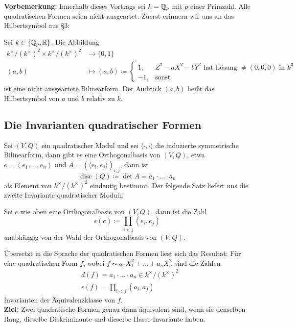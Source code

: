 \textbf{Vorbemerkung:} Innerhalb dieses Vortrags sei $k=\mathbb{Q}_p$ mit $p$ einer Primzahl. Alle quadratischen Formen 
seien nicht ausgeartet. Zuerst erinnern wir uns an das Hilbertsymbol aus §3:
\begin{remind}[Hilbertsymbol]
    Sei $k\in\{\mathbb{Q}_p,\mathbb{R}\}$. Die Abbildung 
    \begin{align*}
        k^\times/(k^\times)^2\times k^\times/(k^\times)^2&\to \{0,1\} \\  (a,b) &\mapsto (a,b) \coloneqq 
        \begin{cases}
            1, & Z^2-aX^2-bY^2 \text{ hat Lösung } \neq (0,0,0)\text{ in } k^3  \\ 
            -1, & \text{sonst}
        \end{cases}
    \end{align*}
    ist eine nicht ausgeartete Bilinearform. Der Audruck $(a,b)$ heißt das \textrm{Hilbertsymbol} von $a$ und $b$ relativ zu $k$.
\end{remind}
\subsection*{Die Invarianten quadratischer Formen}
Sei $(V,Q)$ ein quadratischer Modul und sei $\langle \cdot,\cdot\rangle$ die induzierte symmetrische Bilinearform, dann gibt es eine Orthogonalbasis von
$(V,Q)$, etwa $e=(e_1,\ldots,e_n)$ und $A=(\langle e_i,e_j\rangle)_{i,j}$, dann ist
\[
\operatorname{disc}(Q) \coloneqq \det A = a_1\cdot\ldots\cdot a_n     
\]
als Element von $k^\times/(k^\times)^2$ eindeutig bestimmt. Der folgende Satz liefert uns die zweite Invariante quadratischer Moduln
\begin{satz} Sei $e$ wie oben eine Orthogonalbasis von $(V,Q)$, dann ist die Zahl
    \[
    \epsilon(e) \coloneqq \prod_{i<j}(e_i,e_j)    
    \]
    unabhängig von der Wahl der Orthogonalbasis von $(V,Q)$.
\end{satz}
Übersetzt in die Sprache der quadratischen Formen liest sich das Resultat: Für eine quadratischen Form $f$, wobei 
$
f\sim a_1X_1^2+\ldots+a_nX_n^2    
$ sind die Zahlen 
\begin{align*}
    &d(f) = a_1\cdot\ldots\cdot a_n \in k^\times/(k^\times)^2 \\ 
    &\epsilon(f) = \prod_{i<j}(a_i,a_j)
\end{align*}
Invarianten der Äquivalenzklasse von $f$. \\ \textbf{Ziel:} Zwei quadratische Formen genau dann äquivalent sind, wenn 
sie denselben Rang, dieselbe Diskriminante und dieselbe Hasse-Invariante haben.
